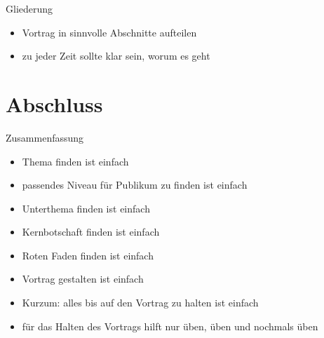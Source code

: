 \documentclass{beamer}
\begin{document}
    \begin{frame}{Gliederung}
        \begin{itemize}
            \item Vortrag in sinnvolle Abschnitte aufteilen
            \item zu jeder Zeit sollte klar sein, worum es geht
        \end{itemize}
    \end{frame}

\section{Abschluss}

\begin{frame}{Zusammenfassung}
    \begin{itemize}
        \item Thema finden ist einfach
        \item passendes Niveau für Publikum zu finden ist einfach
        \item Unterthema finden ist einfach
        \item Kernbotschaft finden ist einfach
        \item Roten Faden finden ist einfach
        \item Vortrag gestalten ist einfach
        \item Kurzum: alles bis auf den Vortrag zu halten ist einfach
        \item für das Halten des Vortrags hilft nur üben, üben und nochmals üben
    \end{itemize}
\end{frame}
\end{document}
